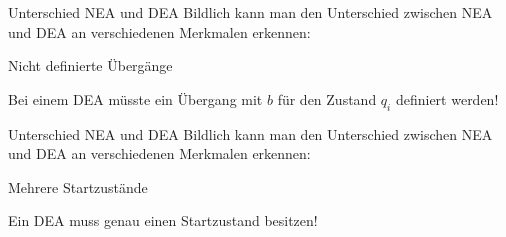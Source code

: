 \begin{frame}[fragile]{Unterschied NEA und DEA}
    Bildlich kann man den Unterschied zwischen NEA und DEA an verschiedenen Merkmalen erkennen:
    \begin{alertblock}{Nicht definierte Übergänge}
        \begin{center}
        \end{center}
        Bei einem DEA müsste ein Übergang mit \alert{$b$} für den Zustand $q_i$ definiert werden!
    \end{alertblock}
\end{frame}

\begin{frame}[fragile]{Unterschied NEA und DEA}
    Bildlich kann man den Unterschied zwischen NEA und DEA an verschiedenen Merkmalen erkennen:
    \begin{alertblock}{Mehrere Startzustände}
        \begin{center}
        \end{center}
        Ein DEA muss \alert{genau einen} Startzustand besitzen!
    \end{alertblock}
\end{frame}

